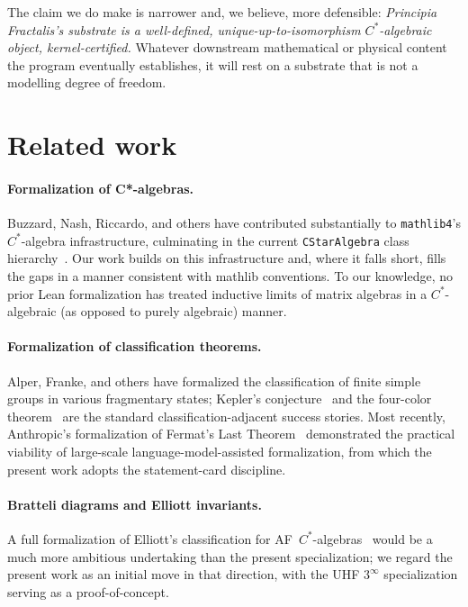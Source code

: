 \documentclass[11pt,a4paper]{article}
\theoremstyle{plain}
\theoremstyle{definition}
\begin{document}
The claim we do make is narrower and, we believe, more defensible: \emph{Principia Fractalis's substrate is a well-defined, unique-up-to-isomorphism $C^{\ast}$-algebraic object, kernel-certified.} Whatever downstream mathematical or physical content the program eventually establishes, it will rest on a substrate that is not a modelling degree of freedom.

\section{Related work}
\label{sec:related}

\paragraph{Formalization of C*-algebras.} Buzzard, Nash, Riccardo, and others have contributed substantially to \texttt{mathlib4}'s $C^{\ast}$-algebra infrastructure, culminating in the current \texttt{CStarAlgebra} class hierarchy~\cite{mathlib_cstar_2026}. Our work builds on this infrastructure and, where it falls short, fills the gaps in a manner consistent with mathlib conventions. To our knowledge, no prior Lean formalization has treated inductive limits of matrix algebras in a $C^{\ast}$-algebraic (as opposed to purely algebraic) manner.

\paragraph{Formalization of classification theorems.} Alper, Franke, and others have formalized the classification of finite simple groups in various fragmentary states; Kepler's conjecture~\cite{hales_kepler_formal_2017} and the four-color theorem~\cite{gonthier_4color_2008} are the standard classification-adjacent success stories. Most recently, Anthropic's formalization of Fermat's Last Theorem~\cite{anthropic_flt_2026} demonstrated the practical viability of large-scale language-model-assisted formalization, from which the present work adopts the statement-card discipline.

\paragraph{Bratteli diagrams and Elliott invariants.} A full formalization of Elliott's classification for AF~$C^{\ast}$-algebras~\cite{elliott1976} would be a much more ambitious undertaking than the present specialization; we regard the present work as an initial move in that direction, with the UHF $3^{\infty}$ specialization serving as a proof-of-concept.
\end{document}
